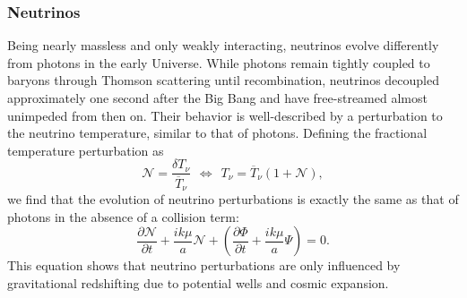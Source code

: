 \documentclass{aa}
\numberwithin{equation}{section}
\numberwithin{table}{section}
\numberwithin{figure}{section}
\begin{document}
\subsubsection{Neutrinos}
Being nearly massless and only weakly interacting, neutrinos evolve differently from photons in the early Universe. While photons remain tightly coupled to baryons through Thomson scattering until recombination, neutrinos decoupled approximately one second after the Big Bang and have free-streamed almost unimpeded from then on. Their behavior is well-described by a perturbation to the neutrino temperature, similar to that of photons. Defining the fractional temperature perturbation as
\begin{equation}
  \mathcal{N} = \frac{\delta T_\nu}{\overline{T}_\nu} \hspace{5pt}\Leftrightarrow\hspace{5pt} T_\nu = \overline{T}_\nu (1 + \mathcal{N}),
\end{equation}
we find that the evolution of neutrino perturbations is exactly the same as that of photons in the absence of a collision term:
\begin{equation}
\frac{\partial \mathcal{N}}{\partial t} + \frac{ik\mu}{a} \mathcal{N} + \left(\frac{\partial \Phi}{\partial t} + \frac{ik\mu}{a} \Psi \right) = 0.
\end{equation}
This equation shows that neutrino perturbations are only influenced by gravitational redshifting due to potential wells and cosmic expansion. 
\end{document}
